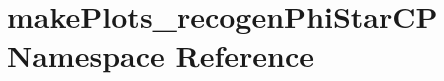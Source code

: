 \hypertarget{namespacemakePlots__recogenPhiStarCP}{
\section{makePlots\_\-recogenPhiStarCP Namespace Reference}
\label{namespacemakePlots__recogenPhiStarCP}
}
